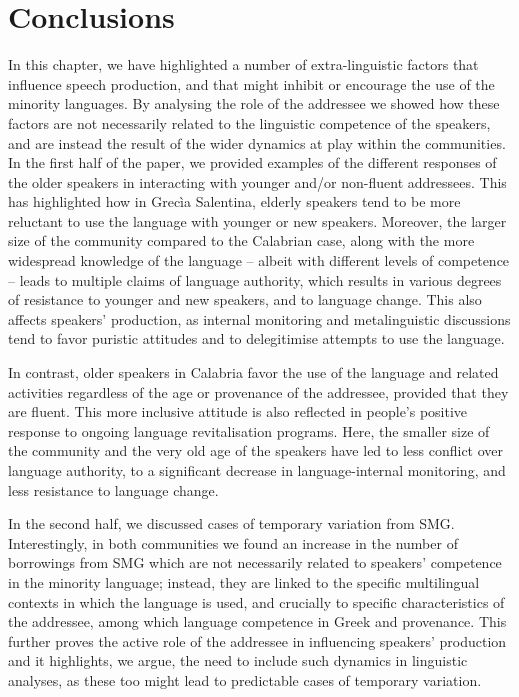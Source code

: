 \documentclass[output=paper,hidelinks]{langscibook}
\begin{document}
\section{Conclusions}
In this chapter, we have highlighted a number of extra-linguistic factors that influence speech production, and that might inhibit or encourage the use of the minority languages. By analysing the role of the addressee we showed how these factors are not necessarily related to the linguistic competence of the speakers, and are instead the result of the wider dynamics at play within the communities. In the first half of the paper, we provided examples of the different responses of the older speakers in interacting with younger and/or non-fluent addressees. This has highlighted how in Grecìa Salentina, elderly speakers tend to be more reluctant to use the language with younger or new speakers. Moreover, the larger size of the community compared to the Calabrian case, along with the more widespread knowledge of the language -- albeit with different levels of competence -- leads to multiple claims of language authority, which results in various degrees of resistance to younger and new speakers, and to language change. This also affects speakers’ production, as internal monitoring and metalinguistic discussions tend to favor puristic attitudes and to delegitimise attempts to use the language. 



In contrast, older speakers in Calabria favor the use of the language and related activities regardless of the age or provenance of the addressee, provided that they are fluent. This more inclusive attitude is also reflected in people’s positive response to ongoing language revitalisation programs. Here, the smaller size of the community and the very old age of the speakers have led to less conflict over language authority, to a significant decrease in language-internal monitoring, and less resistance to language change. 



In the second half, we discussed cases of temporary variation from SMG. Interestingly, in both communities we found an increase in the number of borrowings from SMG which are not necessarily related to speakers’ competence in the minority language; instead, they are linked to the specific multilingual contexts in which the language is used, and crucially to specific characteristics of the addressee, among which language competence in Greek and provenance. This further proves the active role of the addressee in influencing speakers’ production \citep{bell2001back} and it highlights, we argue, the need to include such dynamics in linguistic analyses, as these too might lead to predictable cases of temporary variation.
\end{document}
